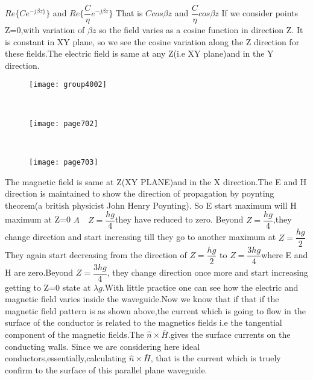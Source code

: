 	${Re\{Ce^{-j\beta z\}}\}}$ and ${Re\{\dfrac{C}{\eta}e^{-j\beta z}}\}$ That is ${Ccos\beta z}$ and ${\dfrac{C}{\eta}cos\beta z}$ If we consider points Z=0,with variation of ${\beta z}$
	so the field varies as a cosine function in direction Z. It is constant in XY plane, so we see the cosine variation along the Z direction for these fields.The electric field is same at any Z(i.e XY plane)and in the Y direction.\\
	\begin{figure}[h]
		\centering
		\texttt{[image: group4002]}
		\caption{}
	\end{figure}\\
	\begin{figure}[h]
	\centering
	\texttt{[image: page702]}
	\caption{}
\end{figure}
	\\
		\begin{figure}[h]
		\centering
		\texttt{[image: page703]}
		\caption{}
	\end{figure}

The magnetic field is same at Z(XY PLANE)and in the X direction.The E and H direction is maintained to show the direction of propagation by poynting theorem(a british physicist John Henry Poynting). So E start maximum will H maximum at Z=0 \quad${A\quad Z= \dfrac{hg}{4}}$they have reduced to zero. Beyond ${Z= \dfrac{hg}{4}}$,they change direction and start increasing till they go to another maximum at ${Z=\dfrac{hg}{2}}$ They again start decreasing from the direction of ${Z=\dfrac{hg}{2}}$ to ${Z=\dfrac{3hg}{4}}$where E and H are zero.Beyond ${Z=\dfrac{3hg}{4}}$,  they change direction once more and start increasing getting to Z=0 state at ${\lambda g}$.With little practice one can see how the electric and magnetic field varies inside the waveguide.Now we know that if that if the magnetic field pattern is as shown above,the current which is going to flow in the surface of the conductor is related to the magnetics fields i.e the tangential component of the magnetic fields.The ${\hat{n}\times\bar{H}}$.gives the surface currents on the conducting walls. Since we are considering here ideal conductors,essentially,calculating ${\hat{n}\times\bar{H}}$, that is the current which is truely confirm to the surface of this parallel plane waveguide. 
